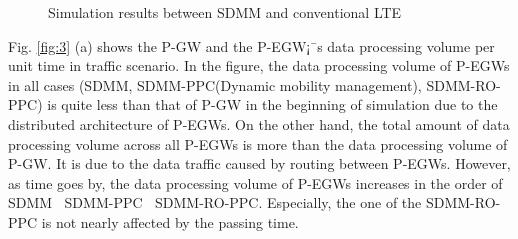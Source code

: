 \documentclass[runningheads,a4paper]{llncs}
\begin{document}
\begin{figure}[t] 
\centering 
{}
\caption{Simulation results between SDMM and conventional LTE}
\label{fig:2}
\end{figure}

Fig. \ref{fig:3} (a) shows the P-GW and the P-EGW¡¯s data processing volume per unit time in traffic scenario. In the figure, the data processing volume of P-EGWs in all cases (SDMM, SDMM-PPC(Dynamic mobility management), SDMM-RO-PPC) is quite less than that of P-GW in the beginning of simulation due to the distributed architecture of P-EGWs. On the other hand, the total amount of data processing volume across all P-EGWs is more than the data processing volume of P-GW. It is due to the data traffic caused by routing between P-EGWs. However, as time goes by, the data processing volume of P-EGWs increases in the order of SDMM $\>$ SDMM-PPC $\>$ SDMM-RO-PPC. Especially, the one of the SDMM-RO-PPC is not nearly affected by the passing time.
\end{document}
